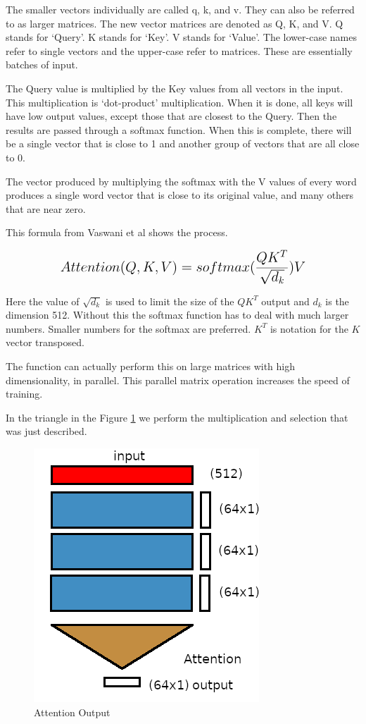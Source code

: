 The smaller vectors individually are called q, k, and v. They can also be referred to as larger matrices. The new vector matrices are denoted as Q, K, and V. Q stands for `Query'. K stands for `Key'. V stands for `Value'. The lower-case names refer to single vectors and the upper-case refer to matrices. These are essentially batches of input.

The Query value is multiplied by the Key values from all vectors in the input. This multiplication is `dot-product' multiplication. When it is done, all keys will have low output values, except those that are closest to the Query. Then the results are passed through a softmax function. When this is complete, there will be a single vector that is close to 1 and another group of vectors that are all close to 0.

The vector produced by multiplying the softmax with the V values of every word produces a single word vector that is close to its original value, and many others that are near zero.

This formula from Vaswani et al \cite{Vaswani2017AttentionIA} shows the process.

$$
\mathlarger{ \mathlarger{
Attention(Q,K,V)=softmax(\dfrac{QK^T}{\sqrt{d_k}})V
} }
$$

Here the value of $\sqrt{d_k}$ is used to limit the size of the $QK^T$ output and $d_k$ is the dimension 512. Without this the softmax function has to deal with much larger numbers. Smaller numbers for the softmax are preferred. $K^T$ is notation for the $K$ vector transposed.

The function can actually perform this on large matrices with high dimensionality, in parallel. This parallel matrix operation increases the speed of training.

In the triangle in the Figure \ref{attantion-7} we perform the multiplication and selection that was just described.

\begin{figure}[H]
	\begin{center}
		
		
		\includegraphics[scale=0.5]{diagram-mat07}
	\end{center}
	\caption[Attention Output]{Attention Output}
	
	\label{attantion-7}
\end{figure}




